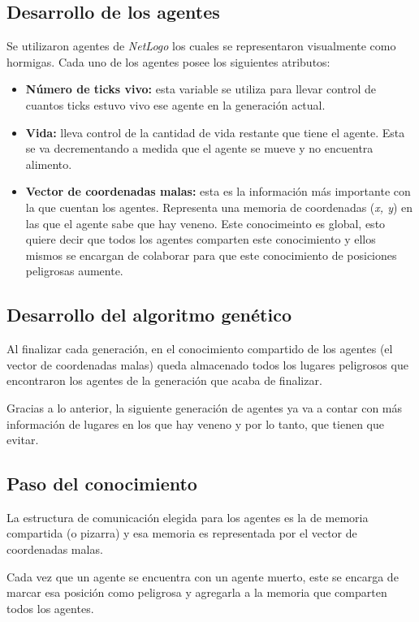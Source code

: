 \documentclass[times,10pt,twocolumn]{article}
\begin{document}
\subsection{Desarrollo de los agentes}
Se utilizaron agentes de \emph{NetLogo} los cuales se representaron visualmente como hormigas. Cada uno de los agentes posee los siguientes atributos:
\begin{itemize}
    \item \textbf{Número de ticks vivo:} esta variable se utiliza para llevar control de cuantos ticks estuvo vivo ese agente en la generación actual.
    \item \textbf{Vida:} lleva control de la cantidad de vida restante que tiene el agente. Esta se va decrementando a medida que el agente se mueve y no encuentra alimento.
    \item \textbf{Vector de coordenadas malas:} esta es la información más importante con la que cuentan los agentes. Representa una memoria de coordenadas (\emph{x, y}) en las que el agente sabe que hay veneno. Este conocimeinto es global, esto quiere decir que todos los agentes comparten este conocimiento y ellos mismos se encargan de colaborar para que este conocimiento de posiciones peligrosas aumente.
\end{itemize}
\subsection{Desarrollo del algoritmo genético}
Al finalizar cada generación, en el conocimiento compartido de los agentes (el vector de coordenadas malas) queda almacenado todos los lugares peligrosos que encontraron los agentes de la generación que acaba de finalizar.\par
Gracias a lo anterior, la siguiente generación de agentes ya va a contar con más información de lugares en los que hay veneno y por lo tanto, que tienen que evitar.\par
\subsection{Paso del conocimiento}
La estructura de comunicación elegida para los agentes es la de memoria compartida (o pizarra) y esa memoria es representada por el vector de coordenadas malas.\par
Cada vez que un agente se encuentra con un agente muerto, este se encarga de marcar esa posición como peligrosa y agregarla a la memoria que comparten todos los agentes.
\end{document}
